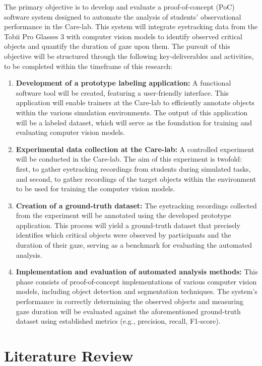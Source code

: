 \documentclass[english]{hogent-article}
\begin{document}
The primary objective is to develop and evaluate a proof-of-concept (PoC) software system designed to automate the analysis of students' observational performance in the Care-lab.
This system will integrate eyetracking data from the Tobii Pro Glasses 3 with computer vision models to identify observed critical objects and quantify the duration of gaze upon them.
The pursuit of this objective will be structured through the following key-deliverables and activities, to be completed within the timeframe of this research:
\begin{enumerate}
    \item \textbf{Development of a prototype labeling application:} A functional software tool will be created, featuring a user-friendly interface.
    This application will enable trainers at the Care-lab to efficiently annotate objects within the various simulation environments.
    The output of this application will be a labeled dataset, which will serve as the foundation for training and evaluating computer vision models.
    \item \textbf{Experimental data collection at the Care-lab:} A controlled experiment will be conducted in the Care-lab. 
    The aim of this experiment is twofold: first, to gather eyetracking recordings from students during simulated tasks, and second, to gather recordings of the target objects within the environment to be used for training the computer vision models.
    \item \textbf{Creation of a ground-truth dataset:} The eyetracking recordings collected from the experiment will be annotated using the developed prototype application.
    This process will yield a ground-truth dataset that precisely identifies which critical objects were observed by participants and the duration of their gaze, serving as a benchmark for evaluating the automated analysis.
    \item \textbf{Implementation and evaluation of automated analysis methods:} This phase consists of proof-of-concept implementations of various computer vision models, including object detection and segmentation techniques.
    The system's performance in correctly determining the observed objects and measuring gaze duration will be evaluated against the aforementioned ground-truth dataset using established metrics (e.g., precision, recall, F1-score).
\end{enumerate}

\section{Literature Review}
\label{sec:literature review}
\end{document}
